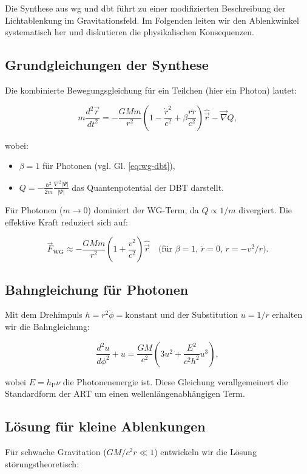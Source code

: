Die Synthese aus \gls{wg} und \gls{dbt} führt zu einer modifizierten Beschreibung der Lichtablenkung im Gravitationsfeld. Im Folgenden leiten wir den Ablenkwinkel systematisch her
und diskutieren die physikalischen Konsequenzen.

\subsection{Grundgleichungen der Synthese}
Die kombinierte Bewegungsgleichung für ein Teilchen (hier ein Photon) lautet:

\begin{equation}
m \frac{d^2 \vec{r}}{dt^2} = -\frac{GMm}{r^2} \left(1 - \frac{\dot{r}^2}{c^2} + \beta \frac{r \ddot{r}}{c^2}\right) \hat{\vec{r}} - \vec{\nabla} Q,
\end{equation}

wobei:
\begin{itemize}
\item $\beta = 1$ für Photonen (vgl. Gl. \ref{eq:wg-dbt}),
\item $Q = -\frac{\hbar^2}{2m} \frac{\nabla^2 |\Psi|}{|\Psi|}$ das Quantenpotential der DBT darstellt.
\end{itemize}

Für Photonen ($m \to 0$) dominiert der WG-Term, da $Q \propto 1/m$ divergiert. Die effektive Kraft reduziert sich auf:

\begin{equation}
\vec{F}_{\text{WG}} \approx -\frac{GMm}{r^2} \left(1 + \frac{v^2}{c^2}\right) \hat{\vec{r}} \quad \text{(für $\beta = 1$, $\dot{r} = 0$, $\ddot{r} = -v^2/r$)}.
\end{equation}

\subsection{Bahngleichung für Photonen}
Mit dem Drehimpuls $h = r^2 \dot{\phi} = \text{konstant}$ und der Substitution $u = 1/r$ erhalten wir die Bahngleichung:

\begin{equation}
\frac{d^2 u}{d\phi^2} + u = \frac{GM}{c^2} \left(3u^2 + \frac{E^2}{c^2 h^2} u^3\right),
\label{eq:bahngleichung}
\end{equation}

wobei $E = h_{\text{P}} \nu$ die Photonenenergie ist. Diese Gleichung verallgemeinert die Standardform der ART um einen wellenlängenabhängigen Term.

\subsection{Lösung für kleine Ablenkungen}
Für schwache Gravitation ($GM/c^2 r \ll 1$) entwickeln wir die Lösung störungstheoretisch:

